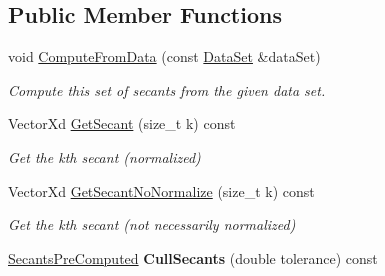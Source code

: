 \subsection*{Public Member Functions}
\begin{DoxyCompactItemize}
\item 
\hypertarget{struct_d_r_d_s_p_1_1_secants_pre_computed_a07644fb406546e3e6f5adbebd472a968}{void \hyperlink{struct_d_r_d_s_p_1_1_secants_pre_computed_a07644fb406546e3e6f5adbebd472a968}{Compute\-From\-Data} (const \hyperlink{struct_d_r_d_s_p_1_1_data_set}{Data\-Set} \&data\-Set)}\label{struct_d_r_d_s_p_1_1_secants_pre_computed_a07644fb406546e3e6f5adbebd472a968}

\begin{DoxyCompactList}\small\item\em Compute this set of secants from the given data set. \end{DoxyCompactList}\item 
\hypertarget{struct_d_r_d_s_p_1_1_secants_pre_computed_a97086e7908c47815d8570c9e8cbac7c5}{Vector\-Xd \hyperlink{struct_d_r_d_s_p_1_1_secants_pre_computed_a97086e7908c47815d8570c9e8cbac7c5}{Get\-Secant} (size\-\_\-t k) const }\label{struct_d_r_d_s_p_1_1_secants_pre_computed_a97086e7908c47815d8570c9e8cbac7c5}

\begin{DoxyCompactList}\small\item\em Get the kth secant (normalized) \end{DoxyCompactList}\item 
\hypertarget{struct_d_r_d_s_p_1_1_secants_pre_computed_a9af341c4da934bd319392be47d58081d}{Vector\-Xd \hyperlink{struct_d_r_d_s_p_1_1_secants_pre_computed_a9af341c4da934bd319392be47d58081d}{Get\-Secant\-No\-Normalize} (size\-\_\-t k) const }\label{struct_d_r_d_s_p_1_1_secants_pre_computed_a9af341c4da934bd319392be47d58081d}

\begin{DoxyCompactList}\small\item\em Get the kth secant (not necessarily normalized) \end{DoxyCompactList}\item 
\hypertarget{struct_d_r_d_s_p_1_1_secants_pre_computed_a8dcdb9edcefeee50e17d6ab3b792f5e6}{\hyperlink{struct_d_r_d_s_p_1_1_secants_pre_computed}{Secants\-Pre\-Computed} {\bfseries Cull\-Secants} (double tolerance) const }\label{struct_d_r_d_s_p_1_1_secants_pre_computed_a8dcdb9edcefeee50e17d6ab3b792f5e6}

\end{DoxyCompactItemize}
